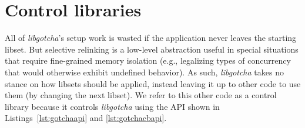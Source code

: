 \section{Control libraries}
\label{sec:libgotcha:control}

All of \textit{libgotcha}'s setup work is wasted if the application never leaves the
starting libset.  But selective relinking is a low-level abstraction useful in
special situations that require fine-grained memory isolation (e.g., legalizing types
of concurrency that would otherwise exhibit undefined behavior).
As such, \textit{libgotcha} takes no stance on
how libsets should be applied, instead leaving it up to other code to use them (by
changing the next libset).  We refer to this other code as a control library because
it controls \textit{libgotcha} using the API shown in Listings~\ref{lst:gotchaapi}
and \ref{lst:gotchacbapi}.

